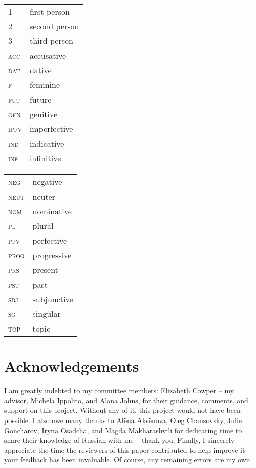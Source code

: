 \documentclass[output=paper,
modfonts,
newtxmath,
hidelinks,
]{langscibook}
\begin{document}
\begin{tabularx}{.5\textwidth}{@{}lQ@{}}
\textsc{1}&first person\\
\textsc{2}&second person\\
\textsc{3}&third person\\
\textsc{acc}&accusative\\
\textsc{dat}&dative\\
\textsc{f}&feminine\\
\textsc{fut}&future\\
\textsc{gen}&genitive\\
\textsc{ipfv}&imperfective\\
\textsc{ind}&indicative\\
\textsc{inf}&infinitive\\
\end{tabularx}%
\begin{tabularx}{.5\textwidth}{@{}lQ@{}}
\textsc{neg}&negative\\
\textsc{neut}&neuter\\
\textsc{nom}&nominative\\
\textsc{pl}&plural\\
\textsc{pfv}&perfective\\
\textsc{prog}&progressive\\
\textsc{prs}&present\\
\textsc{pst}&past\\
\textsc{sbj}&subjunctive\\
\textsc{sg}&singular\\
\textsc{top}&topic\\
\end{tabularx}

\section*{Acknowledgements}
I am greatly indebted to my committee members: Elizabeth Cowper -- my advisor, Michela Ippolito, and Alana Johns, for their guidance, comments, and support on this project. Without any of it, this project would not have been possible. I also owe many thanks to Alëna Aksënova, Oleg Chausovsky, Julie Goncharov, Iryna Osadcha, and Magda Makharashvili for dedicating time to share their knowledge of Russian with me -- thank you. Finally, I sincerely appreciate the time the reviewers of this paper contributed to help improve it -- your feedback has been invaluable. Of course, any remaining errors are my own.


\printbibliography[heading=subbibliography,notkeyword=this]
\end{document}
